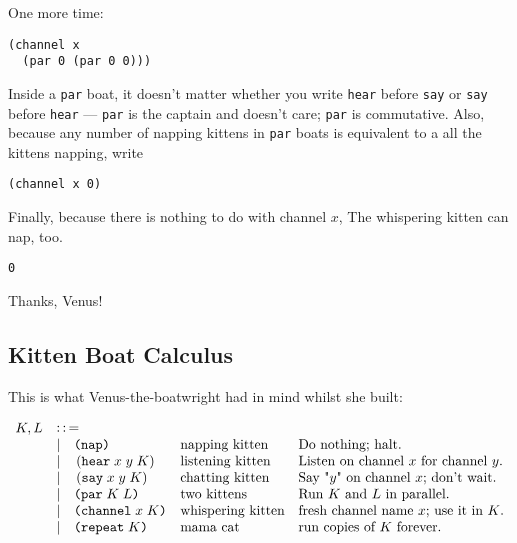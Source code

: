 \documentclass[10pt,oneside,x11names]{article}
\newcommand{\Coloneqq}{\mathrel{\vcenter{\hbox{$:\,:\,=$}}{}}}
\theoremstyle{definition}
\theoremstyle{warning}
\newcommand\say [3]{\left(\texttt{say}\thickspace{}#1\thickspace{}#2\thickspace{}#3\right)}
\newcommand\hear[3]{\left(\texttt{hear}\thickspace{}#1\thickspace{}#2\thickspace{}#3\right)}
\newcommand\knapping    [0]{\texttt{(nap)}}
\newcommand\kpar        [2]{\texttt{(par}\thickspace{}#1\thickspace{}#2\texttt{)}}
\newcommand\kwhispering [2]{\texttt{(channel}\thickspace{}#1\thickspace{}#2\texttt{)}}
\newcommand\kmama       [1]{\texttt{(repeat}\thickspace{}#1\texttt{)}}
\begin{document}
One more time:

\vskip 0.26cm
\begin{verbatim}
(channel x
  (par 0 (par 0 0)))
\end{verbatim}

Inside a \texttt{par} boat, it doesn't matter whether you write
\texttt{hear} before \texttt{say} or \texttt{say} before \texttt{hear} --- \texttt{par} is the
captain and doesn't care; \texttt{par} is commutative. Also, because
any number of napping kittens in \texttt{par} boats is equivalent to
a all the kittens napping, write

\vskip 0.26cm
\begin{verbatim}
(channel x 0)
\end{verbatim}

\newpage
Finally, because there is nothing to do with channel \(x\), The
whispering kitten can nap, too.

\vskip 0.26cm
\begin{verbatim}
0
\end{verbatim}

Thanks, Venus!

\subsection{Kitten Boat Calculus}
\label{sec:orgfdaa6b4}

This is what Venus-the-boatwright had in mind whilst she built:

\begin{equation}
\begin{array}{clll}
  K, L & \Coloneqq \\
       & | \quad \knapping            & \textrm{napping kitten}    & \textrm{Do nothing; halt.}                                   \\
       & | \quad \hear{x}{y}{K}       & \textrm{listening kitten}  & \textrm{Listen on channel }x\textrm{ for channel }y.         \\
       & | \quad \say{x}{y}{K}        & \textrm{chatting kitten}   & \textrm{Say "}y\textrm{" on channel }x\textrm{; don't wait.} \\
       & | \quad \kpar{K}{L}          & \textrm{two kittens}       & \textrm{Run }K\textrm{ and }L\textrm{ in parallel.}          \\
       & | \quad \kwhispering{x}{K}   & \textrm{whispering kitten} & \textrm{fresh channel name }x\textrm{; use it in }K\textrm{.}\\
       & | \quad \kmama{K}            & \textrm{mama cat}          & \textrm{run copies of }K\textrm{ forever}\textrm{.}          \\
\end{array}
\end{equation}
\end{document}
